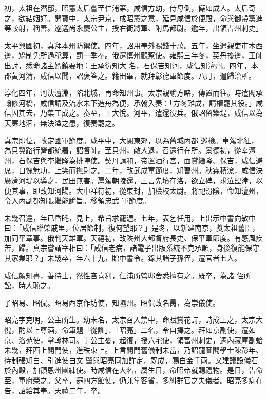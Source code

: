 \begin{pinyinscope}
 初，太祖在潛邸，昭憲太后嘗至仁浦第，咸信方幼，侍母側，儼如成人。太后奇之，欲結姻好。開寶中，太宗尹京，成昭憲之意，延見咸信於便殿，命與御帶黨進等較射，稱善。遂選尚永慶公主，授右衛將軍、附馬都尉。逾年，出領吉州刺史」



 太平興國初，真拜本州防禦使。四年，詔用奉外賜錢十萬。五年，坐遣親吏市木西邊，矯制免所過稅算，罰一季奉。俄遷慎州觀察使。雍熙三年冬，契丹擾邊，王師出討，悉命諸主婿鎮要地：王承衍知大
 名，石保吉知河，咸信知澶州。四年，本郡黃河清，咸信以聞，詔褒答之。籍田畢，就拜彰德軍節度。八月，遣歸治所。



 淳化四年，河決澶淵，陷北城，再命知州事。太宗親諭方略，傳置而往。時遣閻承翰修河橋，咸信請及流水未下造舟為便，承翰入奏：「方冬難成，請權罷其役。」咸信因其去，乃集工成之。奏至，上大悅。河平，遣還役兵。俄詔留築堤，咸信以為天寒地涸，無決溢之患，復奏罷之。



 真宗即位，改定國軍節度。咸平中，大閱東郊，以為舊城內都
 巡檢。車駕北征，為貝冀路行營都統署，詔督師。至貝州，敵人退，召還行在所。景德初，從幸澶州，石保吉與李繼隆為排陣使。契丹請和，帝置酒行宮，面賞繼隆、保吉，咸信避席，自愧無功，上笑而撫尉之。二年，改武成軍節度，知曹州。秋霖積潦，咸信決廣濟河堤以導之，民田無害。扈駕朝陵還，上言先墳在洛，欲立碑，求泣盟津，以便其事，即改知河陽。大中祥符初，從東封，加檢校太尉。將祀汾陰，命知澶州，令入內副都知張繼能諭旨。移領忠武
 軍節度。



 未幾召還，年已昏眊，見上，希旨求寵渥。七年，表乞任用，上出示中書向敏中曰：「咸信聯榮戚里，位居節制，復何望耶？」是冬，以新建南京，獎太祖舊臣，加同平章事。俄判天雄軍。天禧初，改陜州大都督府長史、保平軍節度。有感風疾苦，歸。真宗嘗謂宰相曰：「咸信老病，諸電子出版系統不克承順，身後復能保守其家業耶？」未幾卒，年六十九，贈中書令。錄其諸子孫侄，遷官者七人。



 咸信頗知書，善待士，然性吝喜利，仁浦所營邸舍悉擅有之。既卒，為諸
 侄所訟，時人恥之。



 子昭易、昭侃。昭易西京作坊使，知隰州。昭侃改名昺，為崇儀使。



 昭亮字克明，公主所生。幼未名，太宗召入禁中，命賦賞花詩，詩成上之，太宗大悅，酌以上尊酒，命筆題「從訓」、「昭亮」二名，令自擇之。拜如京副使，遷如京、洛苑使，掌翰林司。丁公主憂，起復，授六宅使，領富州刺史，遷內藏庫副蛤未幾，拜西上閣門使，進秩東上。上言閣門舊儀制未當，乃詔龍圖閣學士陳彭年、待制張知白、引進使白文
 肇與昭亮同加詳定，既成，賜白金千兩。又建議設儀石於內殿，加領恩州團練使。時咸信在大名，屬生日，命昭帝就賜禮物。是日，告命至，軍府榮之。父卒，遷四方館使，仍兼掌客省，多糾群官之失儀者。昭亮多病在告，詔給其奉。天禧二年，卒。




\end{pinyinscope}
